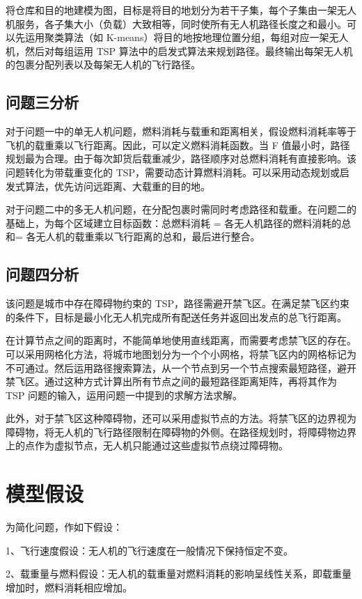 \documentclass[a4paper]{article} %
\begin{document}
{    将仓库和目的地建模为图，目标是将目的地划分为若干子集，每个子集由一架无人机服务，各子集大小（负载）大致相等，同时使所有无人机路径长度之和最小。可以先运用聚类算法（如 K-means）将目的地按地理位置分组，每组对应一架无人机，然后对每组运用 TSP 算法中的启发式算法来规划路径。最终输出每架无人机的包裹分配列表以及每架无人机的飞行路径。

    \subsection{问题三分析}
    对于问题一中的单无人机问题，燃料消耗与载重和距离相关，假设燃料消耗率等于飞机的载重乘以飞行距离。因此，可以定义燃料消耗函数。当 F 值最小时，路径规划最为合理。由于每次卸货后载重减少，路径顺序对总燃料消耗有直接影响。该问题转化为带载重变化的 TSP，需要动态计算燃料消耗。可以采用动态规划或启发式算法，优先访问远距离、大载重的目的地。

    对于问题二中的多无人机问题，在分配包裹时需同时考虑路径和载重。在问题二的基础上，为每个区域建立目标函数：总燃料消耗 = 各无人机路径的燃料消耗的总和= 各无人机的载重乘以飞行距离的总和，最后进行整合。

    \subsection{问题四分析}
    该问题是城市中存在障碍物约束的 TSP，路径需避开禁飞区。在满足禁飞区约束的条件下，目标是最小化无人机完成所有配送任务并返回出发点的总飞行距离。

    在计算节点之间的距离时，不能简单地使用直线距离，而需要考虑禁飞区的存在。可以采用网格化方法，将城市地图划分为一个个小网格，将禁飞区内的网格标记为不可通过。然后运用路径搜索算法，从一个节点到另一个节点搜索最短路径，避开禁飞区。通过这种方式计算出所有节点之间的最短路径距离矩阵，再将其作为 TSP 问题的输入，运用问题一中提到的求解方法求解。

    此外，对于禁飞区这种障碍物，还可以采用虚拟节点的方法。将禁飞区的边界视为障碍物，将无人机的飞行路径限制在障碍物的外侧。在路径规划时，将障碍物边界上的点作为虚拟节点，无人机只能通过这些虚拟节点绕过障碍物。

    \section{模型假设}
    为简化问题，作如下假设：

    1、飞行速度假设：无人机的飞行速度在一般情况下保持恒定不变。

    2、载重量与燃料假设：无人机的载重量对燃料消耗的影响呈线性关系，即载重量增加时，燃料消耗相应增加。

}
\end{document}
